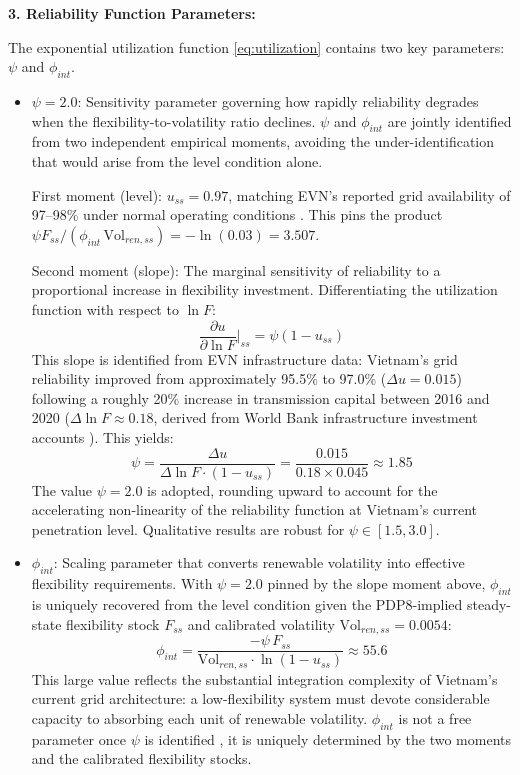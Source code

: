 \documentclass[12pt, a4paper]{article}
\begin{document}
	\textbf{3. Reliability Function Parameters:}
	
	The exponential utilization function \eqref{eq:utilization} contains two key parameters: $\psi$ and $\phi_{int}$.
	
	\begin{itemize}
		\item $\psi = 2.0$: Sensitivity parameter governing how rapidly reliability degrades when the flexibility-to-volatility ratio declines. $\psi$ and $\phi_{int}$ are jointly identified from two independent empirical moments, avoiding the under-identification that would arise from the level condition alone.

		First moment (level): $u_{ss} = 0.97$, matching EVN's reported grid availability of 97--98\% under normal operating conditions \citep{evn2023}. This pins the product $\psi F_{ss}/(\phi_{int}\,\text{Vol}_{ren,ss}) = -\ln(0.03) = 3.507$.

		Second moment (slope): The marginal sensitivity of reliability to a proportional increase in flexibility investment. Differentiating the utilization function with respect to $\ln F$:
		\begin{equation*}
			\frac{\partial u}{\partial \ln F}\bigg|_{ss} = \psi(1-u_{ss})
		\end{equation*}
		This slope is identified from EVN infrastructure data: Vietnam's grid reliability improved from approximately 95.5\% to 97.0\% ($\Delta u = 0.015$) following a roughly 20\% increase in transmission capital between 2016 and 2020 ($\Delta\ln F \approx 0.18$, derived from World Bank infrastructure investment accounts \citep{worldbank2022}). This yields:
		\begin{equation*}
			\psi = \frac{\Delta u}{\Delta\ln F \cdot (1 - u_{ss})} = \frac{0.015}{0.18 \times 0.045} \approx 1.85
		\end{equation*}
		The value $\psi = 2.0$ is adopted, rounding upward to account for the accelerating non-linearity of the reliability function at Vietnam's current penetration level. Qualitative results are robust for $\psi \in [1.5, 3.0]$.

		\item $\phi_{int}$: Scaling parameter that converts renewable volatility into effective flexibility requirements. With $\psi = 2.0$ pinned by the slope moment above, $\phi_{int}$ is uniquely recovered from the level condition given the PDP8-implied steady-state flexibility stock $F_{ss}$ and calibrated volatility $\text{Vol}_{ren,ss} = 0.0054$:
		\begin{equation*}
			\phi_{int} = \frac{-\psi\, F_{ss}}{\text{Vol}_{ren,ss} \cdot \ln(1-u_{ss})} \approx 55.6
		\end{equation*}
		This large value reflects the substantial integration complexity of Vietnam's current grid architecture: a low-flexibility system must devote considerable capacity to absorbing each unit of renewable volatility. $\phi_{int}$ is not a free parameter once $\psi$ is identified ,  it is uniquely determined by the two moments and the calibrated flexibility stocks.
	\end{itemize}
	
\end{document}
